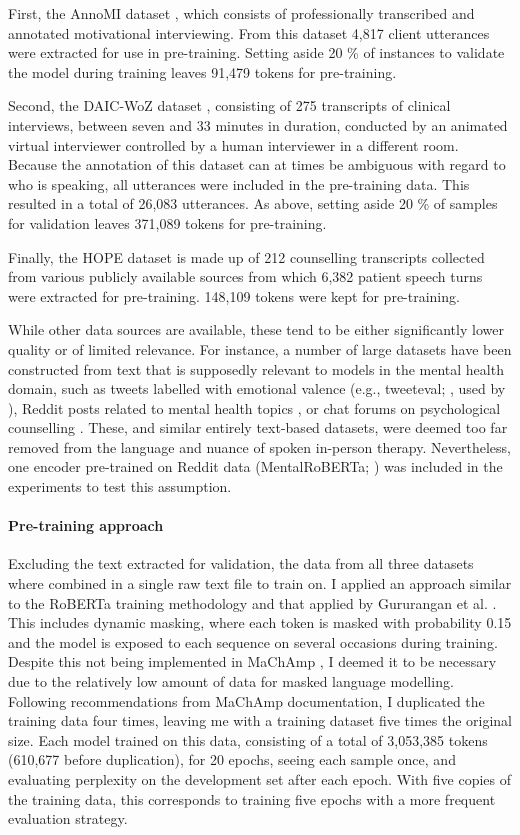 \documentclass[12pt]{report}
\begin{document}
First, the AnnoMI dataset \cite{Wu2022}, which consists of professionally transcribed and annotated motivational interviewing.
From this dataset 4,817 client utterances were extracted for use in pre-training.
Setting aside 20 \% of instances to validate the model during training leaves 91,479 tokens for pre-training.

Second, the DAIC-WoZ dataset \cite{Gratch2014}, consisting of 275 transcripts of clinical interviews, between seven and 33 minutes in duration, conducted by an animated virtual interviewer controlled by a human interviewer in a different room.
Because the annotation of this dataset can at times be ambiguous with regard to who is speaking, all utterances were included in the pre-training data.
This resulted in a total of 26,083 utterances. As above, setting aside 20 \% of samples for validation leaves 371,089 tokens for pre-training.

Finally, the HOPE dataset  is made up of 212 counselling transcripts collected from various publicly available sources from which 6,382 patient speech turns were extracted for pre-training.
148,109 tokens were kept for pre-training.

While other data sources are available, these tend to be either significantly lower quality or of limited relevance.
For instance, a number of large datasets have been constructed from text that is supposedly relevant to models in the mental health domain, such as tweets labelled with emotional valence (e.g., tweeteval; , used by ), Reddit posts related to mental health topics , or chat forums on psychological counselling \cite{counselchat}.
These, and similar entirely text-based datasets, were deemed too far removed from the language and nuance of spoken in-person therapy.
Nevertheless, one encoder pre-trained on Reddit data (MentalRoBERTa; ) was included in the experiments to test this assumption.

\paragraph*{Pre-training approach}
Excluding the text extracted for validation, the data from all three datasets where combined in a single raw text file to train on.
I applied an approach similar to the RoBERTa training methodology and that applied by Gururangan et al. \citeyear{Gururangan2020}.
This includes dynamic masking, where each token is masked with probability 0.15 and the model is exposed to each sequence on several occasions during training.
Despite this not being implemented in MaChAmp \cite{MaChAmp}, I deemed it to be necessary due to the relatively low amount of data for masked language modelling.
Following recommendations from MaChAmp documentation, I duplicated the training data four times, leaving me with a training dataset five times the original size.
Each model trained on this data, consisting of a total of 3,053,385 tokens (610,677 before duplication), for 20 epochs, seeing each sample once, and evaluating perplexity on the development set after each epoch.
With five copies of the training data, this corresponds to training five epochs with a more frequent evaluation strategy.
\end{document}
